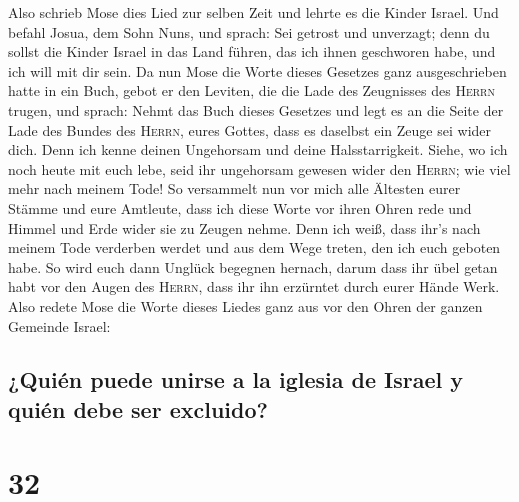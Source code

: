  Also schrieb Mose dies Lied zur selben Zeit und lehrte
es die Kinder Israel.  Und befahl Josua, dem Sohn Nuns,
und sprach: Sei getrost und unverzagt; denn du sollst die Kinder Israel
in das Land führen, das ich ihnen geschworen habe, und ich will mit dir
sein.  Da nun Mose die Worte dieses Gesetzes ganz
ausgeschrieben hatte in ein Buch,  gebot er den Leviten,
die die Lade des Zeugnisses des \textsc{Herrn} trugen, und sprach:
 Nehmt das Buch dieses Gesetzes und legt es an die Seite
der Lade des Bundes des \textsc{Herrn}, eures Gottes, dass es daselbst
ein Zeuge sei wider dich.  Denn ich kenne deinen
Ungehorsam und deine Halsstarrigkeit. Siehe, wo ich noch heute mit euch
lebe, seid ihr ungehorsam gewesen wider den \textsc{Herrn}; wie viel
mehr nach meinem Tode!  So versammelt nun vor mich alle
Ältesten eurer Stämme und eure Amtleute, dass ich diese Worte vor ihren
Ohren rede und Himmel und Erde wider sie zu Zeugen nehme.
 Denn ich weiß, dass ihr's nach meinem Tode verderben
werdet und aus dem Wege treten, den ich euch geboten habe. So wird euch
dann Unglück begegnen hernach, darum dass ihr übel getan habt vor den
Augen des \textsc{Herrn}, dass ihr ihn erzürntet durch eurer Hände Werk.
 Also redete Mose die Worte dieses Liedes ganz aus vor
den Ohren der ganzen Gemeinde Israel:

\hypertarget{quiuxe9n-puede-unirse-a-la-iglesia-de-israel-y-quiuxe9n-debe-ser-excluido}{%
\subsection{¿Quién puede unirse a la iglesia de Israel y quién debe ser
excluido?}\label{quiuxe9n-puede-unirse-a-la-iglesia-de-israel-y-quiuxe9n-debe-ser-excluido}}

\hypertarget{section-31}{%
\section{32}\label{section-31}}

